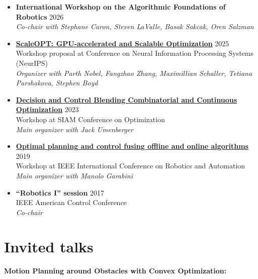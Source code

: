 \documentclass[11pt,a4paper,sans]{moderncv}
\begin{document}
\begin{itemize}

\item \textbf{International Workshop on the Algorithmic Foundations of Robotics} \hfill 2026 \\
\emph{Co-chair with Stephane Caron, Steven LaValle,  Basak Sakcak, Oren Salzman}

\item \href{https://www.cvxgrp.org/scaleopt/}{\color{cyan}\textbf{ScaleOPT: GPU-accelerated and Scalable Optimization}} \hfill 2025 \\
Workshop proposal at Conference on Neural Information Processing Systems (NeurIPS) \\
\emph{Organizer with Parth Nobel, Fangzhao Zhang, Maximillian Schaller, Tetiana Parshakova, Stephen Boyd}

\item \href{https://meetings.siam.org/sess/dsp_programsess.cfm?SESSIONCODE=76788}{\color{cyan}\textbf{Decision and Control Blending Combinatorial and Continuous Optimization}} \hfill 2023 \\
Workshop at SIAM Conference on Optimization \\
\emph{Main organizer with Jack Umenberger}

\item \href{https://sites.google.com/mit.edu/icra19ws}{\color{cyan}\textbf{Optimal planning and control fusing offline and online algorithms}} \hfill 2019 \\
Workshop at IEEE International Conference on Robotics and Automation \\
\emph{Main organizer with Manolo Garabini}

\item \textbf{``Robotics I'' session} \hfill 2017 \\
IEEE American Control Conference \\
\emph{Co-chair}

\end{itemize}

\section{Invited talks}


\textbf{Motion Planning around Obstacles with Convex Optimization:}
\end{document}
